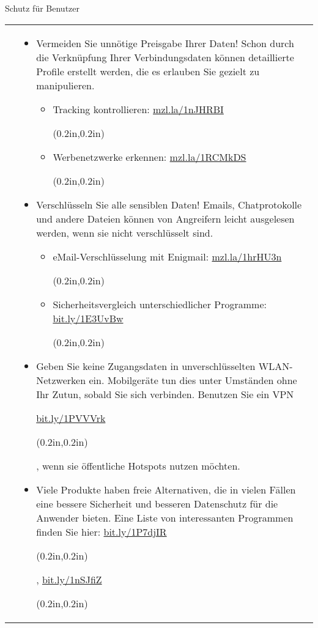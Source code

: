 \documentclass[final]{beamer}
\newcommand{\barcode}[1]{
\url{#1} \begin{pspicture}(0.2in,0.2in) 
\psbarcode[scalex=0.5,scaley=0.5]{#1}{}{qrcode} 
\end{pspicture}
}
\begin{document}
\begin{frame}[t]
\begin{columns}[b]
\begin{column}{0.95\textwidth}
\begin{alertblock}{Schutz für Benutzer}
\begin{tabular*}{20cm}{ ll }
\begin{minipage}[t]{0.45\linewidth}
{\begin{itemize}
 \end{itemize}
 } %
\end{minipage}
 &
\begin{minipage}[t]{0.45\linewidth}

\small {
\begin{itemize}

 \item Vermeiden Sie unnötige Preisgabe Ihrer Daten! Schon durch die Verknüpfung Ihrer 
 Verbindungsdaten können detaillierte Profile erstellt werden, die es erlauben Sie gezielt zu 
 manipulieren.
 \begin{itemize}
    \item Tracking kontrollieren: \barcode{mzl.la/1nJHRBI}
    \item Werbenetzwerke erkennen: \barcode{mzl.la/1RCMkDS}
 \end{itemize}

 \item Verschlüsseln Sie alle sensiblen Daten! Emails, Chatprotokolle und andere Dateien können
 von Angreifern leicht ausgelesen werden, wenn sie nicht verschlüsselt sind. 

 \begin{itemize}
    \item eMail-Verschlüsselung mit Enigmail: \barcode{mzl.la/1hrHU3n}
    \item Sicherheitsvergleich unterschiedlicher Programme: \barcode{bit.ly/1E3UvBw}
 \end{itemize}
  
 \item Geben Sie keine Zugangsdaten in unverschlüsselten WLAN-Netzwerken ein. Mobilgeräte tun
 dies unter Umständen ohne Ihr Zutun, sobald Sie sich verbinden. Benutzen Sie ein VPN 
\barcode{bit.ly/1PVVVrk}, wenn sie öffentliche Hotspots nutzen möchten.
 
 \item Viele Produkte haben freie Alternativen, die in vielen Fällen eine bessere Sicherheit
 und besseren Datenschutz für die Anwender bieten. Eine Liste von interessanten Programmen finden
 Sie hier: \barcode{bit.ly/1P7djIR}, \barcode{bit.ly/1nSJfiZ}

\end{itemize}
} %
\end{minipage}
\end{tabular*}
\end{alertblock}


\end{column}

\end{columns}

\end{frame} %
\end{document}
